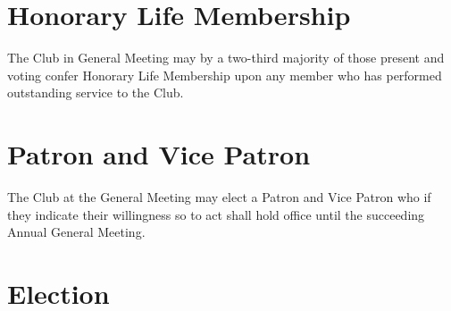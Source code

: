 \documentclass[11pt]{article} %
\begin{document}
\section{Honorary Life Membership}
The Club in General Meeting may by a two-third majority of those present and voting confer Honorary Life Membership upon any member who has performed outstanding service to the Club.

\section{Patron and Vice Patron}
The Club at the General Meeting may elect a Patron and Vice Patron who if they indicate their willingness so to act shall hold office until the succeeding Annual General Meeting.

\section{Election}
\end{document}
